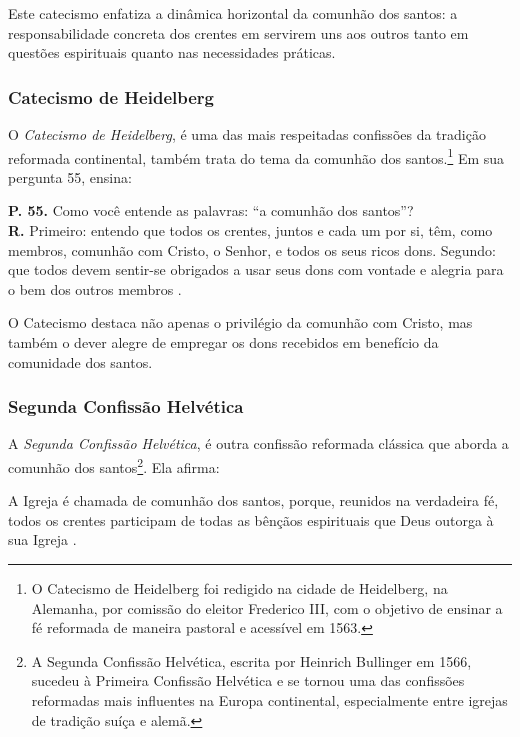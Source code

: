 Este catecismo enfatiza a dinâmica horizontal da comunhão dos santos: a responsabilidade concreta dos crentes em servirem uns aos outros tanto em questões espirituais quanto nas necessidades práticas.

\subsubsection{Catecismo de Heidelberg}
O \textit{Catecismo de Heidelberg}, é uma das mais respeitadas confissões da tradição reformada continental, também trata do tema da comunhão dos santos.\footnote{O Catecismo de Heidelberg foi redigido na cidade de Heidelberg, na Alemanha, por comissão do eleitor Frederico III, com o objetivo de ensinar a fé reformada de maneira pastoral e acessível em 1563.} Em sua pergunta 55, ensina:

\begin{citacao}
    \textbf{P. 55.} Como você entende as palavras: ``a comunhão dos santos''?\\
    \textbf{R.} Primeiro: entendo que todos os crentes, juntos e cada um por si, têm, como membros, comunhão com Cristo, o Senhor, e todos os seus ricos dons. Segundo: que todos devem sentir-se obrigados a usar seus dons com vontade e alegria para o bem dos outros membros \cite{heidelberg}.
\end{citacao}

O Catecismo destaca não apenas o privilégio da comunhão com Cristo, mas também o dever alegre de empregar os dons recebidos em benefício da comunidade dos santos.

\subsubsection{Segunda Confissão Helvética}
A \textit{Segunda Confissão Helvética}, é outra confissão reformada clássica que aborda a comunhão dos santos\footnote{A Segunda Confissão Helvética, escrita por Heinrich Bullinger em 1566, sucedeu à Primeira Confissão Helvética e se tornou uma das confissões reformadas mais influentes na Europa continental, especialmente entre igrejas de tradição suíça e alemã.}. Ela afirma:

\begin{citacao}
    A Igreja é chamada de comunhão dos santos, porque, reunidos na verdadeira fé, todos os crentes participam de todas as bênçãos espirituais que Deus outorga à sua Igreja \cite{helvetica}.
\end{citacao}

